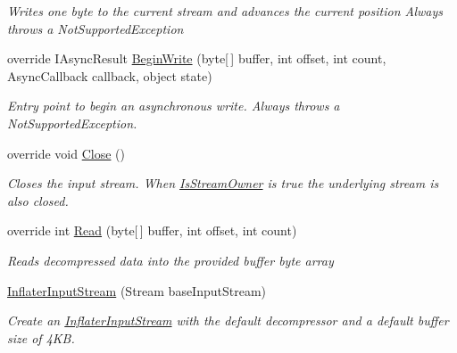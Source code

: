 \begin{DoxyCompactItemize}
\begin{DoxyCompactList}\small\item\em Writes one byte to the current stream and advances the current position Always throws a Not\+Supported\+Exception \end{DoxyCompactList}\item 
override I\+Async\+Result \hyperlink{class_i_c_sharp_code_1_1_sharp_zip_lib_1_1_zip_1_1_compression_1_1_streams_1_1_inflater_input_stream_a291a96116ec0c6b7de43df1de47d805d}{Begin\+Write} (byte\mbox{[}$\,$\mbox{]} buffer, int offset, int count, Async\+Callback callback, object state)
\begin{DoxyCompactList}\small\item\em Entry point to begin an asynchronous write. Always throws a Not\+Supported\+Exception. \end{DoxyCompactList}\item 
override void \hyperlink{class_i_c_sharp_code_1_1_sharp_zip_lib_1_1_zip_1_1_compression_1_1_streams_1_1_inflater_input_stream_a715fe9700f28d1b596de4414114f4c92}{Close} ()
\begin{DoxyCompactList}\small\item\em Closes the input stream. When \hyperlink{class_i_c_sharp_code_1_1_sharp_zip_lib_1_1_zip_1_1_compression_1_1_streams_1_1_inflater_input_stream_ab9b5354e07738945e2f1ff664441088e}{Is\+Stream\+Owner} is true the underlying stream is also closed. \end{DoxyCompactList}\item 
override int \hyperlink{class_i_c_sharp_code_1_1_sharp_zip_lib_1_1_zip_1_1_compression_1_1_streams_1_1_inflater_input_stream_a0ac9269f0c6b75c099605e3363eec65d}{Read} (byte\mbox{[}$\,$\mbox{]} buffer, int offset, int count)
\begin{DoxyCompactList}\small\item\em Reads decompressed data into the provided buffer byte array \end{DoxyCompactList}\item 
\hyperlink{class_i_c_sharp_code_1_1_sharp_zip_lib_1_1_zip_1_1_compression_1_1_streams_1_1_inflater_input_stream_a6e3a380e11673b5851f14c5cec9b08ea}{Inflater\+Input\+Stream} (Stream base\+Input\+Stream)
\begin{DoxyCompactList}\small\item\em Create an \hyperlink{class_i_c_sharp_code_1_1_sharp_zip_lib_1_1_zip_1_1_compression_1_1_streams_1_1_inflater_input_stream}{Inflater\+Input\+Stream} with the default decompressor and a default buffer size of 4\+KB. \end{DoxyCompactList}\item 

\end{DoxyCompactItemize}
